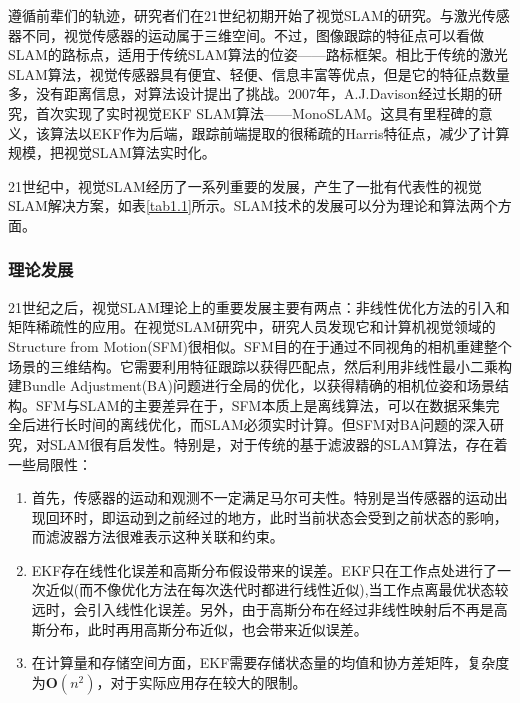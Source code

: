 遵循前辈们的轨迹，研究者们在21世纪初期开始了视觉SLAM的研究。与激光传感器不同，视觉传感器的运动属于三维空间。不过，图像跟踪的特征点可以看做SLAM的路标点，适用于传统SLAM算法的位姿——路标框架\upcite{[1.17]}。相比于传统的激光SLAM算法，视觉传感器具有便宜、轻便、信息丰富等优点，但是它的特征点数量多，没有距离信息，对算法设计提出了挑战。2007年，A.J.Davison经过长期的研究，首次实现了实时视觉EKF SLAM算法——MonoSLAM\upcite{[1.2]}。这具有里程碑的意义，该算法以EKF作为后端，跟踪前端提取的很稀疏的Harris特征点\upcite{[1.18]}，减少了计算规模，把视觉SLAM算法实时化。

21世纪中，视觉SLAM经历了一系列重要的发展，产生了一批有代表性的视觉SLAM解决方案，如表\ref{tab1.1}所示。SLAM技术的发展可以分为理论和算法两个方面。

\subsubsection{理论发展}
21世纪之后，视觉SLAM理论上的重要发展主要有两点：非线性优化方法的引入和矩阵稀疏性的应用。在视觉SLAM研究中，研究人员发现它和计算机视觉领域的Structure from Motion(SFM)很相似。SFM目的在于通过不同视角的相机重建整个场景的三维结构。它需要利用特征跟踪以获得匹配点，然后利用非线性最小二乘构建Bundle Adjustment(BA)问题进行全局的优化，以获得精确的相机位姿和场景结构\upcite{[1.34]}。SFM与SLAM的主要差异在于，SFM本质上是离线算法，可以在数据采集完全后进行长时间的离线优化，而SLAM必须实时计算。但SFM对BA问题的深入研究\upcite{[1.35]}，对SLAM很有启发性。特别是，对于传统的基于滤波器的SLAM算法，存在着一些局限性：

\begin{enumerate}[label={(\arabic*)}]
\item 首先，传感器的运动和观测不一定满足马尔可夫性。特别是当传感器的运动出现回环时，即运动到之前经过的地方，此时当前状态会受到之前状态的影响，而滤波器方法很难表示这种关联和约束。
\item EKF存在线性化误差和高斯分布假设带来的误差。EKF只在工作点处进行了一次近似(而不像优化方法在每次迭代时都进行线性近似),当工作点离最优状态较远时，会引入线性化误差。另外，由于高斯分布在经过非线性映射后不再是高斯分布，此时再用高斯分布近似，也会带来近似误差。
\item 在计算量和存储空间方面，EKF需要存储状态量的均值和协方差矩阵，复杂度为$\boldsymbol{O}(n^2)$，对于实际应用存在较大的限制。
\end{enumerate}

